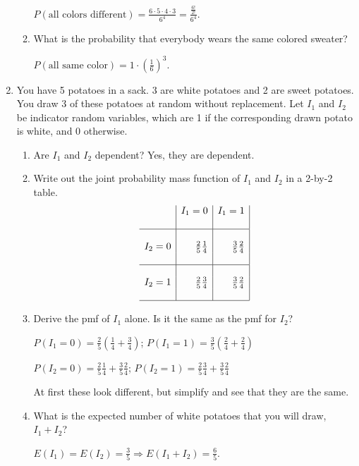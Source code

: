 \documentclass[11pt]{article}
\begin{document}
\begin{enumerate}
\begin{enumerate}
    {\color{red} $P(\textrm{all colors different}) = \frac{6 \cdot 5 \cdot 4 \cdot 3}{6^4} = \frac{\frac{6!}{2!}}{6^4}$.}
\item What is the probability that everybody wears the same colored sweater?

    {\color{red} $P(\textrm{all same color}) = 1 \cdot \left( \frac{1}{6} \right)^3$.}
\end{enumerate}

\item You have 5 potatoes in a sack. 3 are white potatoes and 2 are sweet potatoes. You draw 3 of these potatoes at random without replacement. Let $I_1$ and $I_2$ be indicator random variables, which are 1 if the corresponding drawn potato is white, and 0 otherwise.
\begin{enumerate}
\item Are $I_1$ and $I_2$ dependent? {\color{red} Yes, they are dependent.}
\item Write out the joint probability mass function of $I_1$ and $I_2$ in a 2-by-2 table.
    {\color{red}
    $$
    \begin{array}{r|r|r|}
        &   I_1 = 0 & I_1 = 1\\
    &&\\
    \hline
    &&\\
    I_2 = 0 & \frac{2}{5}\frac{1}{4}    &   \frac{3}{5} \frac{2}{4}\\
    &&\\
    \hline
    &&\\
    I_2 = 1 & \frac{2}{5}\frac{3}{4}    &   \frac{3}{5} \frac{2}{4}\\
    &&\\
    \hline
    \end{array}
    $$}
\item Derive the pmf of $I_1$ alone. Is it the same as the pmf for $I_2$?

    {\color{red}
    $P(I_1 = 0) = \frac{2}{5}\left(\frac{1}{4}+\frac{3}{4}\right)$; $P(I_1 = 1) = \frac{3}{5}\left(\frac{2}{4} + \frac{2}{4}\right)$

    $P(I_2 = 0) = \frac{2}{5}\frac{1}{4}+\frac{3}{5}\frac{2}{4}$; $P(I_2 = 1) = \frac{2}{5}\frac{3}{4}+\frac{3}{5}\frac{2}{4}$

    At first these look different, but simplify and see that they are the same.}
\item What is the expected number of white potatoes that you will draw, $I_1 + I_2$?
    
   {\color{red}
    $E(I_1) = E(I_2) = \frac{3}{5} \Rightarrow E(I_1 + I_2) = \frac{6}{5}$.}
\end{enumerate}


\end{enumerate}
\end{document}

